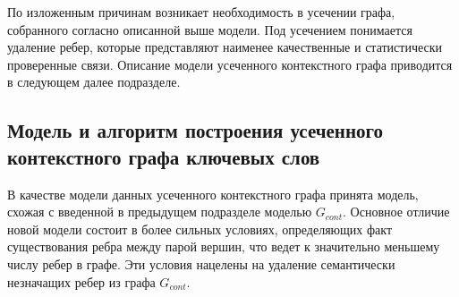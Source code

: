 По изложенным причинам возникает необходимость в усечении графа, собранного согласно описанной выше модели. Под усечением понимается удаление ребер, которые представляют наименее качественные и статистически проверенные связи. Описание модели усеченного контекстного графа приводится в следующем далее подразделе.

\subsection{Модель и алгоритм построения усеченного контекстного графа ключевых слов} \label{trunc_cont}

В качестве модели данных усеченного контекстного графа принята модель, схожая с введенной в предыдущем подразделе моделью $G_{cont}$. Основное отличие новой модели состоит в более сильных условиях, определяющих факт существования ребра между парой вершин, что ведет к значительно меньшему числу ребер в графе. Эти условия нацелены на удаление семантически незначащих ребер из графа $G_{cont}$.
    

